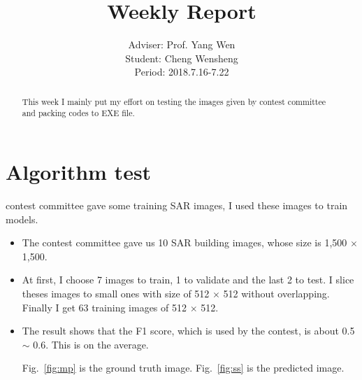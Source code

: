 \documentclass[]{IEEEtran}
\begin{document}
	\title{Weekly Report}
	\author{Adviser: Prof. Yang Wen \\Student: Cheng Wensheng\\ Period: 2018.7.16-7.22
	}
	\maketitle

\begin{abstract}
	This week I mainly put my effort on testing the images given by contest committee and packing codes to EXE file.
\end{abstract}

\section{Algorithm test}
	 contest committee gave some training SAR images, I used these images to train models. 
	\begin{itemize}
		\item The contest committee gave us 10 SAR building images, whose size is 1,500 $\times$ 1,500.  
		\item At first, I choose 7 images to train, 1 to validate and the last 2 to test. I slice theses images to small ones with size of 512 $\times$ 512 without overlapping. Finally I get 63 training images of 512 $\times$ 512.
		\item The result shows that the F1 score, which is used by the contest, is about 0.5 $\sim$ 0.6. This is on the average.
		
		Fig.~\ref{fig:mp} is the ground truth image. Fig.~\ref{fig:ss} is the predicted image.
	\end{itemize}

\end{document}
